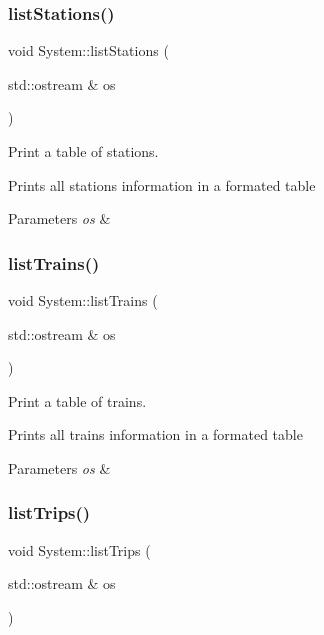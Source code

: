 \subsubsection{\texorpdfstring{list\+Stations()}{listStations()}}
{\footnotesize\ttfamily void System\+::list\+Stations (\begin{DoxyParamCaption}\item[{std\+::ostream \&}]{os }\end{DoxyParamCaption})}



Print a table of stations. 

Prints all stations\textquotesingle{} information in a formated table


\begin{DoxyParams}{Parameters}
{\em os} & \\
\hline
\end{DoxyParams}
\mbox{\label{classSystem_a0a6c0d8d1061893151f9b4ee3332ce85}} 
\subsubsection{\texorpdfstring{list\+Trains()}{listTrains()}}
{\footnotesize\ttfamily void System\+::list\+Trains (\begin{DoxyParamCaption}\item[{std\+::ostream \&}]{os }\end{DoxyParamCaption})}



Print a table of trains. 

Prints all trains\textquotesingle{} information in a formated table


\begin{DoxyParams}{Parameters}
{\em os} & \\
\hline
\end{DoxyParams}
\mbox{\label{classSystem_af11f201f6417c2658f35238d98c6f032}} 
\subsubsection{\texorpdfstring{list\+Trips()}{listTrips()}}
{\footnotesize\ttfamily void System\+::list\+Trips (\begin{DoxyParamCaption}\item[{std\+::ostream \&}]{os }\end{DoxyParamCaption})}



